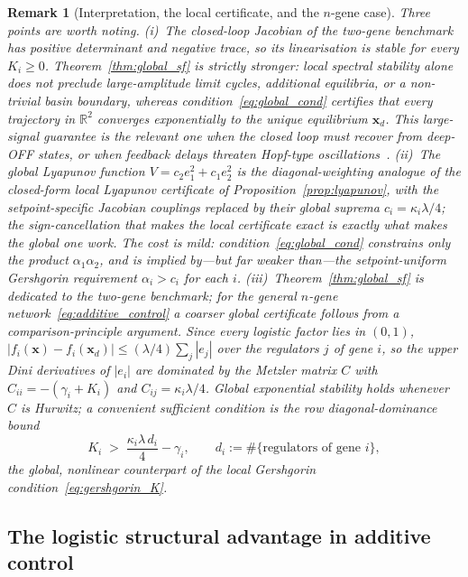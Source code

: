\documentclass[12pt]{article}
\newtheorem{remark}{Remark}
\begin{document}
\begin{remark}[Interpretation, the local certificate, and the $n$-gene case]
\label{rem:global_ngene}
Three points are worth noting. (i)~The closed-loop Jacobian of the
two-gene benchmark has positive determinant and negative trace, so its
\emph{linearisation} is stable for every $K_i\ge 0$.
Theorem~\ref{thm:global_sf} is strictly stronger: local spectral
stability alone does not preclude large-amplitude limit cycles,
additional equilibria, or a non-trivial basin boundary, whereas
condition~\eqref{eq:global_cond} certifies that \emph{every} trajectory
in $\mathbb{R}^2$ converges exponentially to the unique equilibrium
$\mathbf{x}_d$. This large-signal guarantee is the relevant one when the
closed loop must recover from deep-OFF states, or when feedback delays
threaten Hopf-type oscillations~\cite{belgacem2026beyond}.
(ii)~The global Lyapunov function $V=c_2 e_1^2+c_1 e_2^2$ is the
diagonal-weighting analogue of the closed-form \emph{local} Lyapunov
certificate of Proposition~\ref{prop:lyapunov}, with the
setpoint-specific Jacobian couplings replaced by their global suprema
$c_i=\kappa_i\lambda/4$; the sign-cancellation that makes the local
certificate exact is exactly what makes the global one work. The cost is
mild: condition~\eqref{eq:global_cond} constrains only the \emph{product}
$\alpha_1\alpha_2$, and is implied by---but far weaker than---the
setpoint-uniform Gershgorin requirement $\alpha_i>c_i$ for each $i$.
(iii)~Theorem~\ref{thm:global_sf} is dedicated to the two-gene
benchmark; for the general $n$-gene network~\eqref{eq:additive_control} a
coarser global certificate follows from a comparison-principle argument.
Since every logistic factor lies in $(0,1)$,
$|f_i(\mathbf{x})-f_i(\mathbf{x}_d)|\le(\lambda/4)\sum_{j}|e_j|$ over the
regulators $j$ of gene $i$, so the upper Dini derivatives of $|e_i|$ are
dominated by the Metzler matrix $C$ with $C_{ii}=-(\gamma_i+K_i)$ and
$C_{ij}=\kappa_i\lambda/4$. Global exponential stability holds whenever
$C$ is Hurwitz; a convenient sufficient condition is the row
diagonal-dominance bound
\begin{equation}
K_i \;>\; \frac{\kappa_i\lambda\,d_i}{4}-\gamma_i,\qquad
d_i:=\#\{\text{regulators of gene }i\},
\label{eq:global_ngene}
\end{equation}
the \emph{global, nonlinear} counterpart of the local Gershgorin
condition~\eqref{eq:gershgorin_K}.
\end{remark}

\subsection{The logistic structural advantage in additive control}
\label{sec:sf_advantage}
\end{document}
